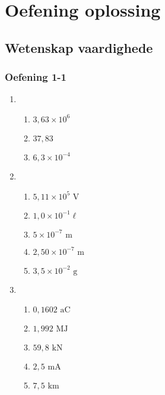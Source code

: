 \chapter{Oefening oplossing}
\section{Wetenskap vaardighede}

\subsection{Oefening 1-1} 
\begin{multicols}{3}
\begin{enumerate}[noitemsep, label=\textbf{\arabic*}. ] 
\item %
  \begin{enumerate}[itemsep=5pt, label=\textbf{(\alph*)} ] 
    \item $3,63 \times 10^6$
    \item $37,83$
    \item $6,3 \times 10^{−4}$
    \end{enumerate}
\item %
    \begin{enumerate}[itemsep=5pt, label=\textbf{(\alph*)} ] 
    \item $5,11 \times 10^{5} \text{ V}$
    \item $1,0 \times 10^{-1} \ell$
    \item $5 \times 10^{-7} \text{ m}$
    \item $2,50 \times 10^{-7} \text{ m}$
    \item $3,5 \times 10^{-2} \text{ g}$
    \end{enumerate}
 \item %
    \begin{enumerate}[itemsep=5pt, label=\textbf{(\alph*)} ] 
    \item $0,1602 \text{ aC}$
    \item $1,992 \text{ MJ}$
    \item $59,8 \text{ kN}$
    \item $2,5 \text{ mA}$
    \item $7,5 \text{ km}$
    \end{enumerate}
\end{enumerate}
\end{multicols}
